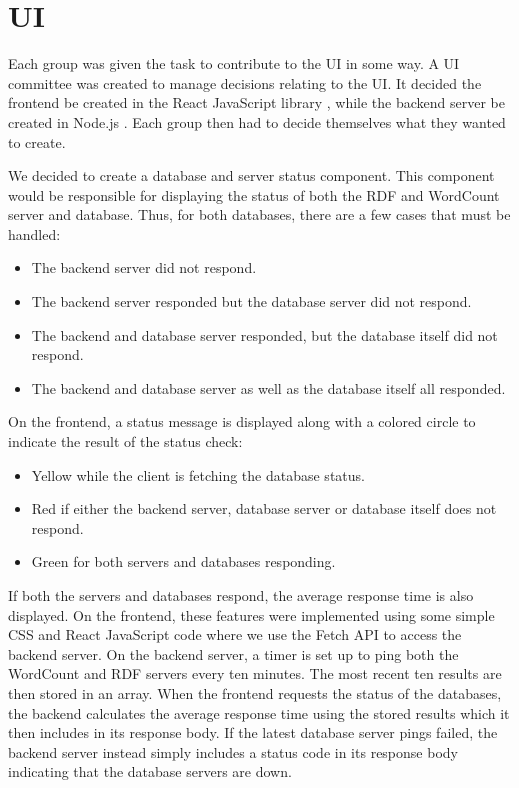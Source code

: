 \section{UI}
Each group was given the task to contribute to the \knox{} UI in some way. 
A UI committee was created to manage decisions relating to the UI. 
It decided the frontend be created in the React JavaScript library \cite{Reactjs}, while the backend server be created in Node.js \cite{Nodejs}.
Each group then had to decide themselves what they wanted to create. 


We decided to create a database and server status component. 
This component would be responsible for displaying the status of both the RDF and WordCount server and database. 
Thus, for both databases, there are a few cases that must be handled:
\begin{itemize}
	\item The backend server did not respond.
	\item The backend server responded but the database server did not respond.
	\item The backend and database server responded, but the database itself did not respond.
	\item The backend and database server as well as the database itself all responded.
\end{itemize}

On the frontend, a status message is displayed along with a colored circle to indicate the result of the status check:
\begin{itemize}
	\item Yellow while the client is fetching the database status.
	\item Red if either the backend server, database server or database itself does not respond.
	\item Green for both servers and databases responding.
\end{itemize}
If both the servers and databases respond, the average response time is also displayed.
On the frontend, these features were implemented using some simple CSS and React JavaScript code where we use the Fetch API to access the backend server.
On the backend server, a timer is set up to ping both the WordCount and RDF servers every ten minutes.
The most recent ten results are then stored in an array.
When the frontend requests the status of the databases, the backend calculates the average response time using the stored results which it then includes in its response body.
If the latest database server pings failed, the backend server instead simply includes a status code in its response body indicating that the database servers are down.



